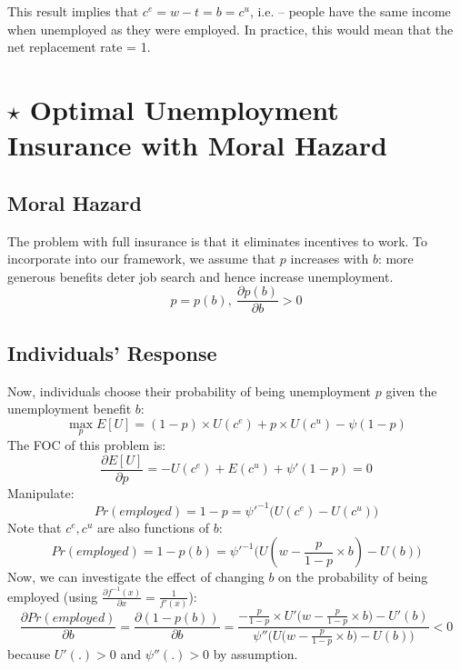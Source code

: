             This result implies that $c^e = w-t = b = c^u$, i.e.  -- people have the same income when unemployed as they were employed. In practice, this would mean that the net replacement rate = 1.
            
\section{$\star$ Optimal Unemployment Insurance with Moral Hazard}

    \subsection{Moral Hazard}
        The problem with full insurance is that it eliminates incentives to work. To incorporate  into our framework, we assume that $p$ increases with $b$: more generous benefits deter job search and hence increase unemployment.
        $$p=p(b),\ \frac{\partial p(b)}{\partial b}>0$$
        
    \subsection{Individuals' Response}
        Now, individuals choose their probability of being unemployment $p$ given the unemployment benefit $b$:
        $$\max_p E[U] = (1-p)\times{U(c^e)} + p\times{U(c^u)} - \psi(1-p)$$
        The FOC of this problem is:
        $$\frac{\partial E[U]}{\partial p}=-U(c^e)+E(c^u)+\psi'(1-p) = 0$$
        Manipulate:
        $$Pr(employed) = 1-p = \psi'^{-1}\Big(U(c^e)-U(c^u)\Big)$$
        Note that $c^e, c^u$ are also functions of $b$:
        \begin{equation}
            \label{eqn:ui_mh_optimal_p}
            Pr(employed) = 1-p(b) = \psi'^{-1}\Big(U(w-\frac{p}{1-p}\times{b})-U(b)\Big)
        \end{equation}
        Now, we can investigate the effect of changing $b$ on the probability of being employed (using $\frac{\partial f^{-1}(x)}{\partial x} = \frac{1}{f'(x)}$):
        $$\frac{\partial Pr(employed)}{\partial b}=\frac{\partial(1-p(b))}{\partial b} = \frac{-\frac{p}{1-p}\times{U'\big(w-\frac{p}{1-p}\times{b}\big)}-U'(b)}{\psi''\Big(U\big(w-\frac{p}{1-p}\times{b}\big)-U(b)\Big)} < 0$$
        because $U'(.)>0$ and $\psi''(.)>0$ by assumption.
        

